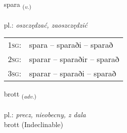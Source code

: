\documentclass[frontgrid, backgrid]{flacards}\usepackage[]{graphicx}\usepackage[]{xcolor}
\begin{document}
\renewcommand{\flhead}{\vskip5pt \fboxsep=0pt {\small\bfseries\footnotesize Sagnorð | czasownik}}
\renewcommand{\fcfoot}{\vskip5pt \fboxsep=0pt \hspace{2pt}{\small\bfseries\footnotesize 3K}}

\renewcommand{\blhead}{\vskip5pt {\small\bfseries\footnotesize Sagnorð | czasownik }}
\renewcommand{\bcfoot}{\vskip5pt \hspace{2pt}{\small\bfseries\footnotesize 3K}}


{spara \small{\textsubscript{(\textit{v.})}} \\[1ex] %
\textphonetic{[spaːra]} \\
pl.: \emph{oszczędzać, zaoszczędzić} \\  [2ex]
\renewcommand*{\arraystretch}{0.8}
\begin{tabular}{p{1cm}l}
\textsc{1sg}: & spara -- sparaði -- sparað \\ 
\textsc{2sg}: & sparar -- sparaðir -- sparað \\ 
\textsc{3sg}: & sparar -- sparaði -- sparað \\ 
\end{tabular}
}


\renewcommand{\flhead}{\vskip5pt \fboxsep=0pt {\small\bfseries\footnotesize Atviksorð | przysłówek}}
\renewcommand{\fcfoot}{\vskip5pt \fboxsep=0pt \hspace{2pt}{\small\bfseries\footnotesize 3K}}

\renewcommand{\blhead}{\vskip5pt {\small\bfseries\footnotesize Atviksorð | przysłówek }}
\renewcommand{\bcfoot}{\vskip5pt \hspace{2pt}{\small\bfseries\footnotesize 3K}}


{brott \small{\textsubscript{(\textit{adv.})}} \\[1ex]
\textphonetic{[prɔht]} \\
pl.: \emph{precz, nieobecny, z dala} \\  [2ex]
brott (Indeclinable)}
\end{document}
